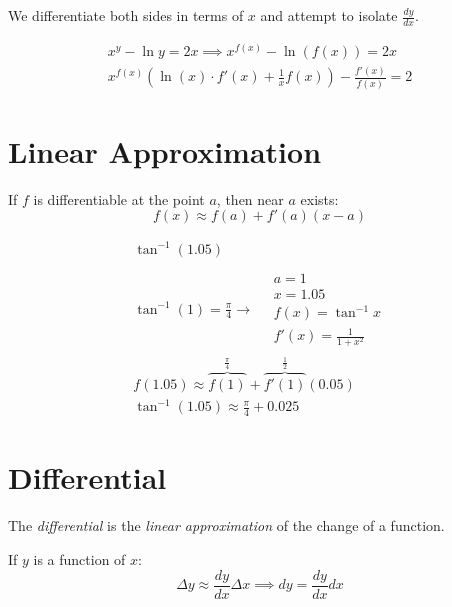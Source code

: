 \documentclass[00_complete]{subfiles}
\begin{document}
We differentiate both sides in terms of $x$ and attempt to isolate $\frac{dy}{dx}$.

\[
    \begin{gathered}
        x^y-\ln y = 2x \implies x^{f(x)} - \ln(f(x))=2x \\
        x^{f(x)}\left(\ln(x)\cdot f'(x)+\frac{1}{x}f(x)\right) - \frac{f'(x)}{f(x)}=2
    \end{gathered}
\]

\section{Linear Approximation}

\begin{reminder}
    If $f$ is differentiable at the point $a$, then near $a$ exists:
    $$f(x) \approx f(a)+f'(a)(x-a)$$
\end{reminder}

\begin{example}
    $$
    \begin{gathered}
        \tan^{-1}(1.05) \\ \\
        \tan^{-1}(1) = \frac{\pi}{4} \to \quad \begin{gathered}
            a = 1 \\ x = 1.05 \\ f(x) = \tan^{-1}x \\ f'(x) = \frac{1}{1+x^2}
        \end{gathered} \\
        f(1.05) \approx \overbrace{f(1)}^{\frac{\pi}{4}} +
        \overbrace{f'(1)}^{\frac{1}{2}}(0.05) \\
        \tan^{-1}(1.05) \approx \frac{\pi}{4} + 0.025
    \end{gathered}
    $$
\end{example}

\section{Differential}

\begin{definition}
    The \emph{differential} is the \emph{linear approximation} of the change of
    a function.
\end{definition}

If $y$ is a function of $x$:
\[
    \Delta y \approx \frac{dy}{dx} \Delta x \implies
    dy = \frac{dy}{dx}dx
\]
\end{document}
